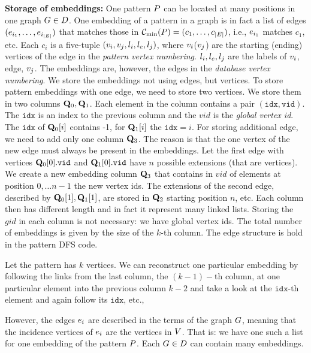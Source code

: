 \noindent\textbf{Storage of embeddings:} One pattern $P$ can be
located at many positions in one graph $G\in D$.  One embedding of
a pattern in a graph is in fact a list of edges $(e_{i_1}, \ldots,
e_{i_{|E|}})$ that matches those in $\mindfscode(\pattern) =
(c_1,\ldots, c_{|E|})$, i.e., $e_{i_1}$ matches $c_1$, etc. Each
$c_i$ is a five-tuple $(v_i, v_j, l_i, l_e, l_j)$,
where $v_i$($v_j$) are the starting (ending) vertices of the
edge in the \emph{pattern vertex numbering}. $l_i, l_e, l_j$
are the labels of $v_i$, edge, $v_j$. The embeddings are,
however, the edges in the \emph{database vertex numbering}. We store
the embeddings not using edges, but vertices. To store pattern
embeddings with one edge, we need to store two vertices. We store them
in two columns $\mathbf{Q}_0, \mathbf{Q}_1$.  Each element in the column
contains a pair $(\texttt{idx}, \texttt{vid})$. The $\texttt{idx}$ is
an index to the previous column and the $vid$ is the \emph{global
  vertex id}. The $\texttt{idx}$ of $\mathbf{Q}_0[i]$ contains -1, for
$\mathbf{Q}_1[i]$ the $\texttt{idx}=i$. For storing additional edge, we
need to add only one column $\mathbf{Q}_3$. The reason is that the one
vertex of the new edge must always be present in the embeddings. Let
the first edge with vertices $\mathbf{Q}_0[0].\texttt{vid}$ and
$\mathbf{Q}_1[0].\texttt{vid}$ have $n$ possible extensions (that are
vertices). We create a new embedding column $\mathbf{Q}_3$ that
contains in $vid$ of elements at position $0,\ldots n-1$ the new
vertex ids. The extensions of the second edge, described by
$\mathbf{Q}_0[1], \mathbf{Q}_1[1]$, are stored in $\mathbf{Q}_2$ starting
position $n$, etc. Each column then has different length and in fact
it represent many linked lists.  Storing the $gid$ in each column is
not necessary: we have global vertex ids. The total number of
embeddings is given by the size of the $k$-th column. The edge
structure is hold in the pattern DFS code.


Let the pattern has $k$ vertices. We can reconstruct one particular
embedding by following the links from the last column, the $(k-1)-$th
column, at one particular element into the previous column $k-2$ and
take a look at the $\texttt{idx}$-th element and again follow its
$\texttt{idx}$, etc.,

However, the edges $e_i$ are described in the terms of the graph
$G$, meaning that the incidence vertices of $e_i$ are the
vertices in $V$. That is: we have one such a list for one embedding
of the pattern $P$. Each $G\in D$ can contain many
embeddings.

